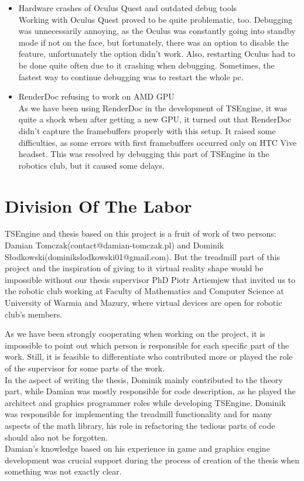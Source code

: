 \begin{itemize}
    \item {Hardware crashes of Oculus Quest and outdated debug tools}\\
    Working with Oculus Quest proved to be quite problematic, too. Debugging was unnecessarily annoying, as the Oculus was constantly going into standby mode if not on the face, but fortunately, there was an option to disable the feature, unfortunately the option didn't work. Also, restarting Oculus had to be done quite often due to it crashing when debugging. Sometimes, the fastest way to continue debugging was to restart the whole pc.
    
    \item {RenderDoc refusing to work on AMD GPU}\\
    As we have been using RenderDoc in the development of TSEngine, it was quite a shock when after getting a new GPU, it turned out that RenderDoc didn't capture the framebuffers properly with this setup. It raised some difficulties, as some errors with first framebuffers occurred only on HTC Vive headset. This was resolved by debugging this part of TSEngine in the robotics club, but it caused some delays.
\end{itemize}

\newpage
\section{Division Of The Labor}
\label{sec:labor}
\hspace{\parindent}
TSEngine and thesis based on this project is a fruit of work of two persons: Damian Tomczak(contact@damian-tomczak.pl) and Dominik Słodkowski(dominikslodkowski01@gmail.com).
But the treadmill part of this project and the inspiration of giving to it virtual reality shape would be impossible without our thesis supervisor PhD Piotr Artiemjew that invited us to the robotic club working at Faculty of Mathematics and Computer Science at University of Warmia and Mazury, where virtual devices are open for robotic club's members.

As we have been strongly cooperating when working on the project, it is impossible to point out which person is responsible for each specific part of the work. Still, it is feasible to differentiate who contributed more or played the role of the supervisor for some parts of the work.\\
In the aspect of writing the thesis, Dominik mainly contributed to the theory part, while Damian was mostly responsible for code description, as he played the architect and graphics programmer roles while developing TSEngine. Dominik was responsible for implementing the treadmill functionality and for many aspects of the math library, his role in refactoring the tedious parts of code should also not be forgotten.\\ Damian's knowledge based on his experience in game and graphics engine development was crucial support during the process of creation of the thesis when something was not exactly clear.  

